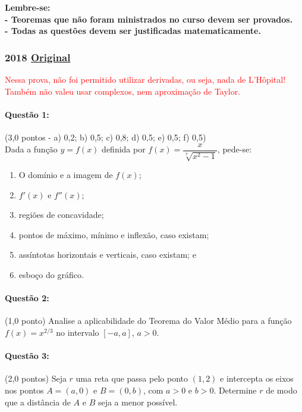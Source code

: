 \documentclass[12pt,a4paper]{article}
\newcommand{\original}[1]{\tiny \href{#1}{Original} \normalsize}
\begin{document}
\textbf{Lembre-se: \\
- Teoremas que não foram ministrados no curso devem ser provados. \\
- Todas as questões devem ser justificadas matematicamente.}

\newpage

\subsubsection{2018 \original{}}
\normalsize{\textcolor{red}{Nessa prova, não foi permitido utilizar derivadas, ou seja, nada de L'Hôpital! Também não valeu usar complexos, nem aproximação de Taylor.}}

\paragraph{Questão 1:} (3,0 pontos - a) 0,2; b) 0,5; c) 0,8; d) 0,5; e) 0,5; f) 0,5)\\
Dada a função $y = f(x)$ definida por $f(x) = \dfrac{x}{\sqrt[7]{x^{2} - 1}}$, pede-se:
\begin{enumerate}[label = (\alph*)]
    \item O domínio e a imagem de $f(x)$;
    \item $f'(x)$ e $f''(x)$;
    \item regiões de concavidade;
    \item pontos de máximo, mínimo e inflexão, caso existam;
    \item assíntotas horizontais e verticais, caso existam; e
    \item esboço do gráfico.
\end{enumerate}

\paragraph{Questão 2:} (1,0 ponto)
Analise a aplicabilidade do Teorema do Valor Médio para a função $f(x) = x^{2/3}$ no intervalo $\left[-a, a\right]$, $a > 0$.

\paragraph{Questão 3:} (2,0 pontos) Seja $r$ uma reta que passa pelo ponto $\left(1, 2\right)$ e intercepta os eixos nos pontos $A = \left(a, 0\right)$ e
$B = \left(0, b\right)$, com $a > 0$ e $b > 0$. Determine $r$ de modo que a distância de $A$ e $B$ seja a menor possível.
\end{document}
